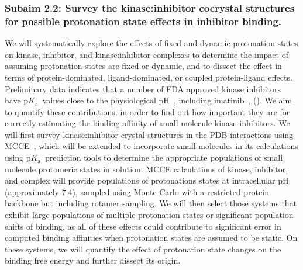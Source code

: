 \documentclass[10pt,final]{article}
\newcommand{\pKa}{p$K_\mathrm{a}$\ }
\newcommand{\pH}{p$\mathrm{H}$\ }
\begin{document}
\subsubsection*{Subaim 2.2: Survey the kinase:inhibitor cocrystal structures for possible protonation state effects in inhibitor binding.}
We will systematically explore the effects of fixed and dynamic protonation states on kinase, inhibitor, and kinase:inhibitor complexes to determine the impact of assuming protonation states are fixed or dynamic, and to dissect the effect in terms of protein-dominated, ligand-dominated, or coupled protein-ligand effects.
%
Preliminary data indicates that a number of FDA approved kinase inhibitors have \pKa values close to the physiological \pH, including imatinib~\autocite{Szakacs2005a}, ().
%
We aim to quantify these contributions, in order to find out how important they are for correctly estimating the binding affinity of small molecule kinase inhibitors.
%
We will first survey kinase:inhibitor crystal structures in the PDB interactions using MCCE~\autocite{Song2009a}, which will be extended to incorporate small molecules in its calculations using \pKa prediction tools to determine the appropriate populations of small molecule protomeric states in solution.
%
MCCE calculations of kinase, inhibitor, and complex will provide populations of protonations states at intracellular pH (approximately 7.4), sampled using Monte Carlo with a restricted protein backbone but including rotamer sampling.
%
We will then select those systems that exhibit large populations of multiple protonation states or significant population shifts of binding, as all of these effects could contribute to significant error in computed binding affinities when protonation states are assumed to be static.
%
On these systems, we will quantify the effect of protonation state changes on the binding free energy and further dissect its origin.
\end{document}
